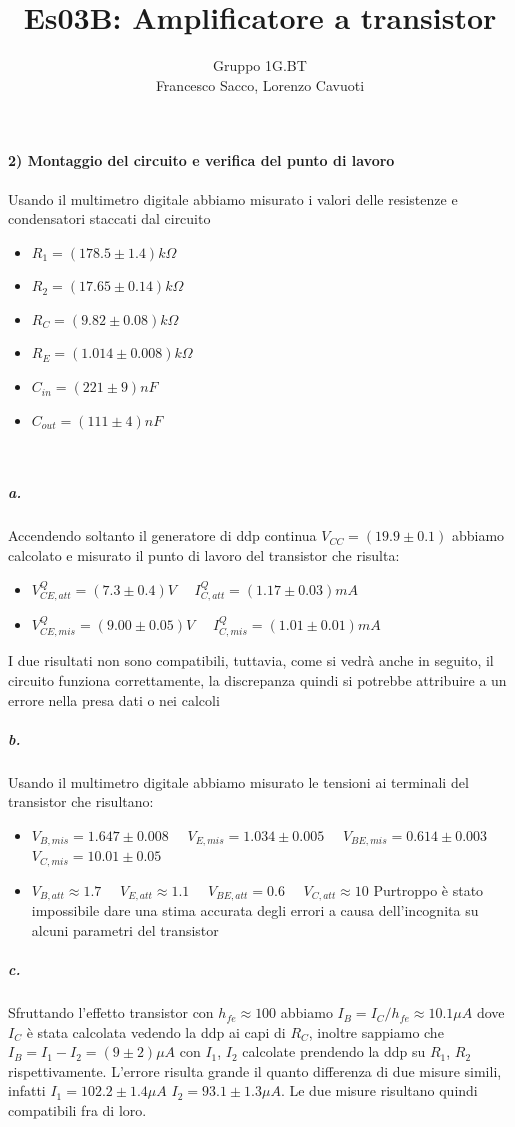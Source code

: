 \documentclass[10pt,a4paper]{article}
\author{Gruppo 1G.BT \\ Francesco Sacco, Lorenzo Cavuoti}
\title{Es03B: Amplificatore a transistor}
\begin{document}
\maketitle
\paragraph{2) Montaggio del circuito e verifica del punto di lavoro}
\newline
Usando il multimetro digitale abbiamo misurato i valori delle resistenze e condensatori staccati dal circuito
\begin{itemize}
\item $R_1=(178.5\pm1.4)k\Omega$ 
\item $R_2=(17.65\pm0.14)k\Omega$ 
\item $R_C=(9.82\pm0.08)k\Omega$ 
\item $R_E=(1.014\pm0.008)k\Omega$
\item $C_{in}=(221\pm9)nF$
\item $C_{out}=(111\pm4)nF$
\end{itemize}
\\
\subparagraph{a.}
Accendendo soltanto il generatore di ddp continua $V_{CC}=(19.9\pm0.1)$ abbiamo calcolato e misurato il punto di lavoro del transistor che risulta:
\begin{itemize}
\item $V_{CE,att}^Q = (7.3\pm0.4)V \quad$ $I_{C,att}^Q = (1.17\pm0.03)mA \quad$
\item $V_{CE,mis}^Q = (9.00\pm0.05)V \quad$ $ I_{C,mis}^Q = (1.01\pm0.01)mA \quad$
\end{itemize}
I due risultati non sono compatibili, tuttavia, come si vedrà anche in seguito, il circuito funziona correttamente, la discrepanza quindi si potrebbe attribuire a un errore nella presa dati o nei calcoli

\subparagraph{b.}
Usando il multimetro digitale abbiamo misurato le tensioni ai terminali del transistor che risultano:
\begin{itemize}
\item $V_{B,mis} = 1.647\pm0.008 \quad$ $V_{E,mis} = 1.034\pm 0.005 \quad$ $V_{BE,mis} = 0.614\pm0.003 \quad$ $V_{C,mis} = 10.01\pm0.05$
\item $V_{B,att} \approx 1.7 \quad$ $V_{E,att} \approx 1.1 \quad$ $V_{BE,att} = 0.6 \quad$ $V_{C,att} \approx 10$\newline
Purtroppo è stato impossibile dare una stima accurata degli errori a causa dell'incognita su alcuni parametri del transistor
\end{itemize}
\subparagraph{c.}
Sfruttando l'effetto transistor con $h_{fe}\approx 100$ abbiamo $I_B = I_C/h_{fe} \approx 10.1 \mu A$ dove $I_C$ è stata calcolata vedendo la ddp ai capi di $R_C$, inoltre sappiamo che $I_B = I_1-I_2 = (9\pm2)\mu A$ con $I_1$, $I_2$ calcolate prendendo la ddp su $R_1$, $R_2$ rispettivamente. L'errore risulta grande il quanto differenza di due misure simili, infatti $I_1=102.2\pm1.4\mu A$ $I_2=93.1\pm1.3\mu A$. Le due misure risultano quindi compatibili fra di loro.
	
\end{document}
